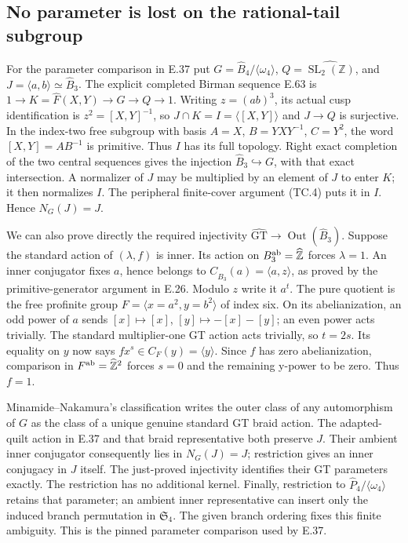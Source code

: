 \subsection{No parameter is lost on the rational-tail subgroup}

For the parameter comparison in E.37 put
$G=\widehat B_4/\langle\omega_4\rangle$,
$Q=\widehat{\operatorname{SL}_2(\mathbb Z)}$, and
$J=\langle a,b\rangle\simeq\widehat B_3$.  The explicit completed
Birman sequence E.63 is
$1\to K=\widehat F(X,Y)\to G\to Q\to1$.
Writing $z=(ab)^3$, its actual cusp identification is
$z^2=[X,Y]^{-1}$, so $J\cap K=I=\langle[X,Y]\rangle$ and
$J\to Q$ is surjective.  In the index-two free subgroup with basis
$A=X$, $B=YXY^{-1}$, $C=Y^2$, the word $[X,Y]=AB^{-1}$ is
primitive.  Thus $I$ has its full topology.  Right exact completion
of the two central sequences gives the injection
$\widehat B_3\hookrightarrow G$, with that exact intersection.
A normalizer of $J$ may be multiplied by an element of $J$ to enter
$K$; it then normalizes $I$.  The peripheral finite-cover argument
(TC.4) puts it in $I$.  Hence $N_G(J)=J$.

We can also prove directly the required injectivity
$\widehat{\mathrm{GT}}\to\operatorname{Out}(\widehat B_3)$.
Suppose the standard action of $(\lambda,f)$ is inner.  Its action
on $B_3^{\rm ab}=\widehat{\mathbb Z}$ forces $\lambda=1$.
An inner conjugator fixes $a$, hence belongs to
$C_{\widehat B_3}(a)=\langle a,z\rangle$, as proved by the
primitive-generator argument in E.26.  Modulo $z$ write it $a^t$.
The pure quotient is the free profinite group
$F=\langle x=a^2,y=b^2\rangle$ of index six.  On its
abelianization, an odd power of $a$ sends
$[x]\mapsto[x]$, $[y]\mapsto-[x]-[y]$; an even power acts
trivially.  The standard multiplier-one GT action acts trivially,
so $t=2s$.  Its equality on $y$ now says
$f x^s\in C_F(y)=\langle y\rangle$.
Since $f$ has zero abelianization, comparison in
$F^{\rm ab}=\widehat{\mathbb Z}^2$ forces $s=0$ and the remaining
y-power to be zero.  Thus $f=1$.

Minamide--Nakamura's classification\cite[Theorem~4.3(i), Corollary~C]{ET_MN2022} writes the outer class of any
automorphism of $G$ as the class of a unique genuine standard GT braid
action.  The adapted-quilt action in E.37 and that braid representative
both preserve $J$.  Their ambient inner conjugator consequently lies
in $N_G(J)=J$; restriction gives an inner conjugacy in $J$ itself.
The just-proved injectivity identifies their GT parameters exactly.
The restriction has no additional kernel.  Finally, restriction to
$\widehat P_4/\langle\omega_4\rangle$ retains that parameter;
an ambient inner representative can insert only the induced branch
permutation in $\mathfrak S_4$.  The given branch ordering fixes this
finite ambiguity.  This is the pinned parameter comparison used by E.37.
